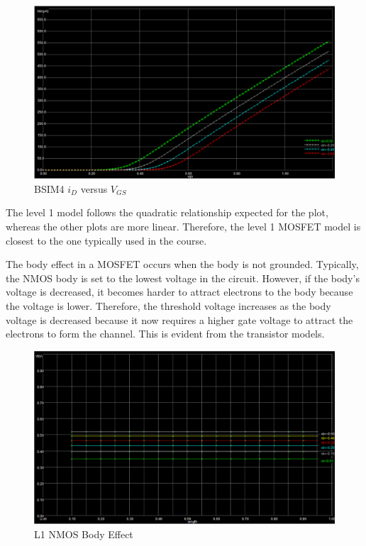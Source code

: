 \FloatBarrier

\FloatBarrier

\begin{figure}[h!]
	\centering
	\includegraphics[scale=0.50]{./images/id_vgs_bsim4.PNG}
	\caption{BSIM4 $i_{D}$ versus $V_{GS}$}
	\label{fig:id_vgs_bsim4}
\end{figure}

\FloatBarrier

The level 1 model follows the quadratic relationship expected for the plot, whereas the other plots are more linear.
Therefore, the level 1 MOSFET model is closest to the one typically used in the course.

The body effect in a MOSFET occurs when the body is not grounded.
Typically, the NMOS body is set to the lowest voltage in the circuit.
However, if the body's voltage is decreased, it becomes harder to attract electrons to the body because the voltage is lower.
Therefore, the threshold voltage increases as the body voltage is decreased because it now requires a higher gate voltage to attract the electrons to form the channel.
This is evident from the transistor models.

\FloatBarrier

\begin{figure}[h!]
	\centering
	\includegraphics[scale=0.50]{./images/level1_body_effect_nmos.PNG}
	\caption{L1 NMOS Body Effect}
	\label{fig:l1_bodyeffect}
\end{figure}

